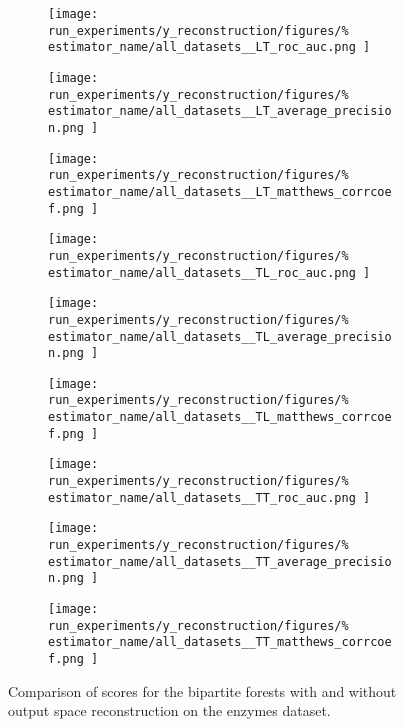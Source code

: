 \documentclass[conference]{IEEEtran}
\begin{document}
\begin{figure*}
    \centering
    \begin{subfigure}{0.32\textwidth}
        \texttt{[image: 
            run\_experiments/y\_reconstruction/figures/\%
            estimator\_name/all\_datasets\_\_LT\_roc\_auc.png
        ]}
    \end{subfigure}
    \begin{subfigure}{0.32\textwidth}
        \texttt{[image: 
            run\_experiments/y\_reconstruction/figures/\%
            estimator\_name/all\_datasets\_\_LT\_average\_precision.png
        ]}
    \end{subfigure}
    \begin{subfigure}{0.32\textwidth}
        \texttt{[image: 
            run\_experiments/y\_reconstruction/figures/\%
            estimator\_name/all\_datasets\_\_LT\_matthews\_corrcoef.png
        ]}
    \end{subfigure}

    \begin{subfigure}{0.32\textwidth}
        \texttt{[image: 
            run\_experiments/y\_reconstruction/figures/\%
            estimator\_name/all\_datasets\_\_TL\_roc\_auc.png
        ]}
    \end{subfigure}
    \begin{subfigure}{0.32\textwidth}
        \texttt{[image: 
            run\_experiments/y\_reconstruction/figures/\%
            estimator\_name/all\_datasets\_\_TL\_average\_precision.png
        ]}
    \end{subfigure}
    \begin{subfigure}{0.32\textwidth}
        \texttt{[image: 
            run\_experiments/y\_reconstruction/figures/\%
            estimator\_name/all\_datasets\_\_TL\_matthews\_corrcoef.png
        ]}
    \end{subfigure}

    \begin{subfigure}{0.32\textwidth}
        \texttt{[image: 
            run\_experiments/y\_reconstruction/figures/\%
            estimator\_name/all\_datasets\_\_TT\_roc\_auc.png
        ]}
    \end{subfigure}
    \begin{subfigure}{0.32\textwidth}
        \texttt{[image: 
            run\_experiments/y\_reconstruction/figures/\%
            estimator\_name/all\_datasets\_\_TT\_average\_precision.png
        ]}
    \end{subfigure}
    \begin{subfigure}{0.32\textwidth}
        \texttt{[image: 
            run\_experiments/y\_reconstruction/figures/\%
            estimator\_name/all\_datasets\_\_TT\_matthews\_corrcoef.png
        ]}
    \end{subfigure}
    \caption{Comparison of scores for the bipartite forests with and without output space reconstruction on the enzymes dataset.}
    \label{fig:box_y_reconstruction}
\end{figure*}
\end{document}
